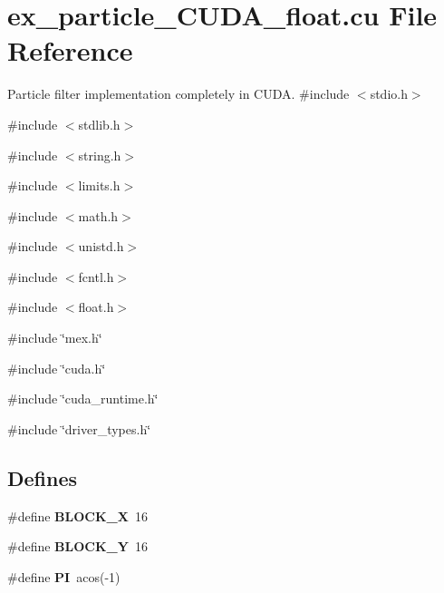 \hypertarget{ex__particle__CUDA__float_8cu}{
\section{ex\_\-particle\_\-CUDA\_\-float.cu File Reference}
\label{ex__particle__CUDA__float_8cu}
}


Particle filter implementation completely in CUDA.  
{\ttfamily \#include $<$stdio.h$>$}\par
{\ttfamily \#include $<$stdlib.h$>$}\par
{\ttfamily \#include $<$string.h$>$}\par
{\ttfamily \#include $<$limits.h$>$}\par
{\ttfamily \#include $<$math.h$>$}\par
{\ttfamily \#include $<$unistd.h$>$}\par
{\ttfamily \#include $<$fcntl.h$>$}\par
{\ttfamily \#include $<$float.h$>$}\par
{\ttfamily \#include \char`\"{}mex.h\char`\"{}}\par
{\ttfamily \#include \char`\"{}cuda.h\char`\"{}}\par
{\ttfamily \#include \char`\"{}cuda\_\-runtime.h\char`\"{}}\par
{\ttfamily \#include \char`\"{}driver\_\-types.h\char`\"{}}\par
\subsection*{Defines}
\begin{DoxyCompactItemize}
\item 
\hypertarget{ex__particle__CUDA__float_8cu_a165bd291e719c4542ebcb897b0fa5481}{
\#define {\bfseries BLOCK\_\-X}~16}
\label{ex__particle__CUDA__float_8cu_a165bd291e719c4542ebcb897b0fa5481}

\item 
\hypertarget{ex__particle__CUDA__float_8cu_a9e261e89727a3aafdc4d8732f5b3389f}{
\#define {\bfseries BLOCK\_\-Y}~16}
\label{ex__particle__CUDA__float_8cu_a9e261e89727a3aafdc4d8732f5b3389f}

\item 
\hypertarget{ex__particle__CUDA__float_8cu_a598a3330b3c21701223ee0ca14316eca}{
\#define {\bfseries PI}~acos(-\/1)}
\label{ex__particle__CUDA__float_8cu_a598a3330b3c21701223ee0ca14316eca}

\end{DoxyCompactItemize}
